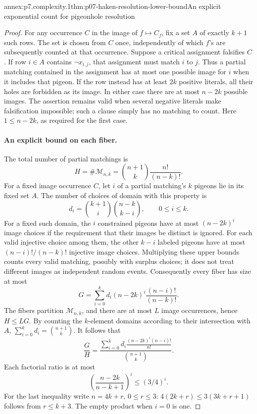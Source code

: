 \begin{annexitem}{annex:p7.complexity.1}{thm:p07-haken-resolution-lower-bound}{An explicit exponential count for pigeonhole resolution}
\begin{proof}
For any occurrence \(C\) in the image of \(f\mapsto C_f\), fix a set
\(A\) of exactly \(k+1\) such rows. The set is chosen from \(C\) once,
independently of which \(f\)'s are subsequently counted at that occurrence.
Suppose a critical assignment falsifies \(C\). If row \(i\in A\)
contains \(\neg x_{i,j}\), that assignment must match \(i\) to \(j\).
Thus a partial matching contained in the assignment has at most one
possible image for \(i\) when it includes that pigeon. If the row instead
has at least \(2k\) positive literals, all their holes are forbidden
as its image. In either case there are at most \(n-2k\) possible images.
The assertion remains valid when several negative literals make
falsification impossible; such a clause simply has no matching to count.
Here \(1\leq n-2k\), as required for the first case.

\paragraph{An explicit bound on each fiber.}
The total number of partial matchings is
\[
 H=\#\mathcal M_{n,k}=\binom{n+1}{k}\frac{n!}{(n-k)!}.
\]
For a fixed image occurrence \(C\), let \(i\) of a partial matching's
\(k\) pigeons lie in its fixed set \(A\). The number of choices of
domain with this property is
\[
 d_i=\binom{k+1}{i}\binom{n-k}{k-i},\qquad 0\leq i\leq k.
\]
For a fixed such domain, the \(i\) constrained pigeons have at most
\((n-2k)^i\) image choices if the requirement that their images be
distinct is ignored. For each valid injective choice among them, the
other \(k-i\) labeled pigeons have at most
\((n-i)!/(n-k)!\) injective image choices. Multiplying these upper
bounds counts every valid matching, possibly with surplus choices;
it does not treat different images as independent random events.
Consequently every fiber has size at most
\[
 G=\sum_{i=0}^{k}d_i(n-2k)^i\frac{(n-i)!}{(n-k)!}.
\]
The fibers partition \(\mathcal M_{n,k}\), and there are at most \(L\)
image occurrences, hence \(H\leq LG\).
By counting the \(k\)-element domains according to their intersection
with \(A\), \(\sum_{i=0}^{k}d_i=\binom{n+1}{k}\). It follows that
\[
 \frac GH
 =\frac{\displaystyle\sum_{i=0}^{k}d_i
          \frac{(n-2k)^i(n-i)!}{n!}}
        {\displaystyle\binom{n+1}{k}}.
\]
Each factorial ratio is at most
\[
 \left(\frac{n-2k}{n-k+1}\right)^i\leq(3/4)^i.
\]
For the last inequality write \(n=4k+r\), \(0\leq r\leq3\):
\(4(2k+r)\leq3(3k+r+1)\) follows from \(r\leq k+3\).
The empty product when \(i=0\) is one.


\end{proof}
\end{annexitem}
